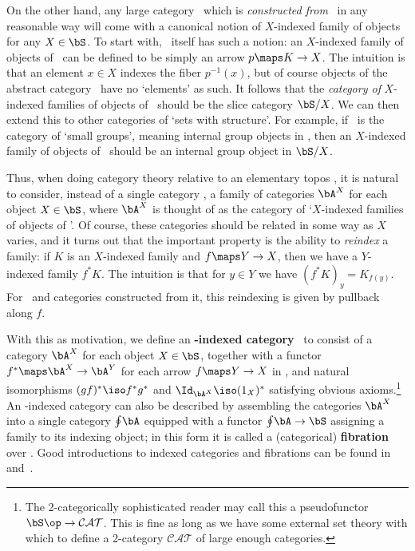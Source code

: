 \documentclass[12pt]{amsart}
\begin{document}
On the other hand, any large category \bA\ which is \emph{constructed
  from} \bS\ in any reasonable way will come with a canonical notion
of $X$-indexed family of objects for any $X\in\bS$.  To start with,
\bS\ itself has such a notion: an $X$-indexed family of objects of
\bS\ can be defined to be simply an arrow $p\maps K\to X$.  The
intuition is that an element $x\in X$ indexes the fiber $p^{-1}(x)$,
but of course objects of the abstract category \bS\ have no `elements'
as such.  It follows that the \emph{category of} $X$-indexed families
of objects of \bS\ should be the slice category $\bS/X$.  We can then
extend this to other categories of `sets with structure'.  For
example, if \bA\ is the category of `small groups', meaning internal
group objects in \bS, then an $X$-indexed family of objects of \bA\
should be an internal group object in $\bS/X$.

Thus, when doing category theory relative to an elementary topos \bS,
it is natural to consider, instead of a single category \bA, a family
of categories $\bA^X$ for each object $X\in\bS$, where $\bA^X$ is
thought of as the category of `$X$-indexed families of objects of
\bA'.  Of course, these categories should be related in some way as
$X$ varies, and it turns out that the important property is the
ability to \emph{reindex} a family: if $K$ is an $X$-indexed family
and $f\maps Y\to X$, then we have a $Y$-indexed family $f^*K$.  The
intuition is that for $y\in Y$ we have $(f^*K)_y=K_{f(y)}$.  For \bS\
and categories constructed from it, this reindexing is given by
pullback along $f$.

With this as motivation, we define an \textbf{\bS-indexed category}
\bA\ to consist of a category $\bA^X$ for each object $X\in\bS$,
together with a functor $f^*\maps \bA^X\to\bA^Y$ for each arrow
$f\maps Y\to X$ in \bS, and natural isomorphisms $(gf)^*\iso f^*g^*$
and $\Id_{\bA^X} \iso (1_X)^*$ satisfying obvious axioms.\footnote{The
  2-categorically sophisticated reader may call this a pseudofunctor
  $\bS\op\to\mathcal{CAT}$.  This is fine as long as we have some
  external set theory with which to define a 2-category
  $\mathcal{CAT}$ of large enough categories.}  An \bS-indexed
category can also be described by assembling the categories $\bA^X$
into a single category $\oint\!\bA$ equipped with a functor
$\oint\!\bA\to \bS$ assigning a family to its indexing object; in this
form it is called a (categorical) \textbf{fibration} over \bS.  Good
introductions to indexed categories and fibrations can be found
in~\cite[Part~B]{ptj:elephant} and~\cite{streicher:fibredcats}.
\end{document}

